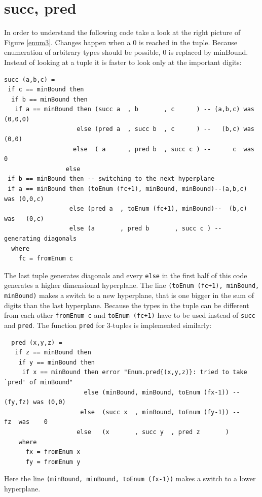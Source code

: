 \documentclass{tmr}
\newcommand{\authornote}[3]{{\color{#2} {\sc #1}: #3}}
\newcommand\bay[1]{\authornote{edward}{blue}{#1}}
\newcommand\tkv[1]{\authornote{Tillmann}{green}{#1}}
\begin{document}
\section{succ, pred}
In order to understand the following code take a look at the right picture  of Figure \ref{enum3}. Changes happen when a 0 is reached in the tuple. Because enumeration of arbitrary types should be possible, 0 is replaced by minBound. Instead of looking at a tuple it is faster to look only at the important digits: %
\small
\begin{Verbatim}
succ (a,b,c) =
 if c == minBound then
  if b == minBound then
   if a == minBound then (succ a  , b       , c      ) -- (a,b,c) was (0,0,0)
                    else (pred a  , succ b  , c      ) --   (b,c) was   (0,0)
                   else  ( a      , pred b  , succ c ) --      c  was      0
                 else
 if b == minBound then -- switching to the next hyperplane
 if a == minBound then (toEnum (fc+1), minBound, minBound)--(a,b,c) was (0,0,c)
                  else (pred a  , toEnum (fc+1), minBound)--  (b,c) was   (0,c)
                  else (a       , pred b       , succ c ) -- generating diagonals
  where
    fc = fromEnum c
\end{Verbatim}
The last tuple generates diagonals and every \verb|else| in the first half of this code generates a higher dimensional hyperplane.
The line \verb|(toEnum (fc+1), minBound, minBound)| makes a switch to a new hyperplane, that is one bigger in the sum of digits than the last hyperplane. Because the types in the tuple can be different from each other \verb|fromEnum c| and \verb|toEnum (fc+1)| have to be used instead of \verb|succ| and \verb|pred|. The function \verb|pred| for 3-tuples is implemented similarly:

\begin{Verbatim}
  pred (x,y,z) =
   if z == minBound then
    if y == minBound then
     if x == minBound then error "Enum.pred{(x,y,z)}: tried to take `pred' of minBound"
                      else (minBound, minBound, toEnum (fx-1)) -- (fy,fz) was (0,0)
                     else  (succ x  , minBound, toEnum (fy-1)) --     fz  was    0
                    else   (x       , succ y  , pred z       )
    where
      fx = fromEnum x
      fy = fromEnum y
\end{Verbatim}
Here the line \verb|(minBound, minBound, toEnum (fx-1))| makes a switch to a lower hyperplane.
\end{document}
